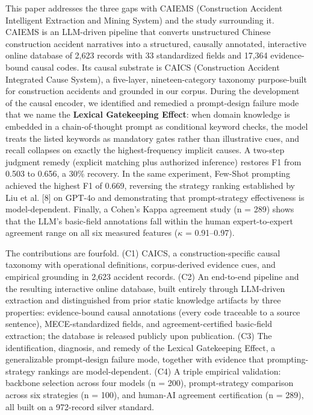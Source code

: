 \documentclass[11pt]{article}
\begin{document}
This paper addresses the three gaps with CAIEMS (Construction Accident Intelligent Extraction and Mining System) and the study surrounding it. CAIEMS is an LLM-driven pipeline that converts unstructured Chinese construction accident narratives into a structured, causally annotated, interactive online database of 2,623 records with 33 standardized fields and 17,364 evidence-bound causal codes. Its causal substrate is CAICS (Construction Accident Integrated Cause System), a five-layer, nineteen-category taxonomy purpose-built for construction accidents and grounded in our corpus. During the development of the causal encoder, we identified and remedied a prompt-design failure mode that we name the \textbf{Lexical Gatekeeping Effect}: when domain knowledge is embedded in a chain-of-thought prompt as conditional keyword checks, the model treats the listed keywords as mandatory gates rather than illustrative cues, and recall collapses on exactly the highest-frequency implicit causes. A two-step judgment remedy (explicit matching plus authorized inference) restores F1 from 0.503 to 0.656, a 30\% recovery. In the same experiment, Few-Shot prompting achieved the highest F1 of 0.669, reversing the strategy ranking established by Liu et al. [8] on GPT-4o and demonstrating that prompt-strategy effectiveness is model-dependent. Finally, a Cohen's Kappa agreement study (n = 289) shows that the LLM's basic-field annotations fall within the human expert-to-expert agreement range on all six measured features ($\kappa$ = 0.91--0.97).

The contributions are fourfold. (C1) CAICS, a construction-specific causal taxonomy with operational definitions, corpus-derived evidence cues, and empirical grounding in 2,623 accident records. (C2) An end-to-end pipeline and the resulting interactive online database, built entirely through LLM-driven extraction and distinguished from prior static knowledge artifacts by three properties: evidence-bound causal annotations (every code traceable to a source sentence), MECE-standardized fields, and agreement-certified basic-field extraction; the database is released publicly upon publication. (C3) The identification, diagnosis, and remedy of the Lexical Gatekeeping Effect, a generalizable prompt-design failure mode, together with evidence that prompting-strategy rankings are model-dependent. (C4) A triple empirical validation: backbone selection across four models (n = 200), prompt-strategy comparison across six strategies (n = 100), and human-AI agreement certification (n = 289), all built on a 972-record silver standard.
\end{document}
